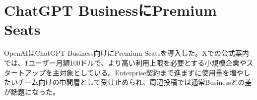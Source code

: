 \section{ChatGPT BusinessにPremium Seats}
OpenAIはChatGPT Business向けにPremium Seatsを導入した。Xでの公式案内では、1ユーザー月額100ドルで、より高い利用上限を必要とする小規模企業やスタートアップを主対象としている。Enterprise契約まで進まずに使用量を増やしたいチーム向けの中間層として受け止められ、周辺投稿では通常Businessとの差が話題になった。
